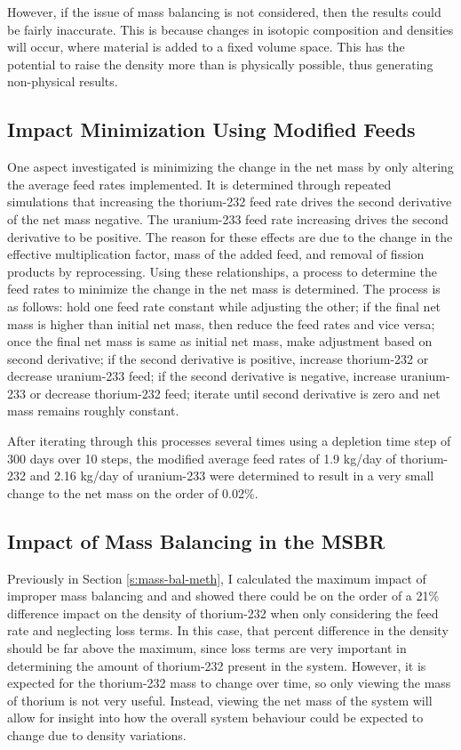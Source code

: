 However, if the issue of mass balancing is not considered, then the results could be fairly inaccurate.
This is because changes in isotopic composition and densities will occur, where material is added to a fixed volume space. This has the potential to raise the density more than is physically possible, thus generating non-physical results.

\subsection{Impact Minimization Using Modified Feeds}

One aspect investigated is minimizing the change in the net mass by only altering the average feed rates implemented. It is determined through repeated simulations that increasing the thorium-232 feed rate drives the second derivative of the net mass negative. The uranium-233 feed rate increasing drives the second derivative to be positive. The reason for these effects are due to the change in the effective multiplication factor, mass of the added feed, and removal of fission products by reprocessing.
Using these relationships, a process to determine the feed rates to minimize the change in the net mass is determined. The process is as follows:  hold one feed rate constant while adjusting the other;
if the final net mass is higher than initial net mass, then reduce the feed rates and vice versa;
once the final net mass is same as initial net mass, make adjustment based on second derivative;
if the second derivative is positive, increase thorium-232 or decrease uranium-233 feed;
if the second derivative is negative, increase uranium-233 or decrease thorium-232 feed;
iterate until second derivative is zero and net mass remains roughly constant.

After iterating through this processes several times using a depletion time step of 300 days over 10 steps, the modified average feed rates of 1.9 kg/day of thorium-232 and 2.16 kg/day of uranium-233 were determined to result in a very small change to the net mass on the order of 0.02\%.

\subsection{Impact of Mass Balancing in the MSBR}

Previously in Section \ref{s:mass-bal-meth}, I calculated the maximum impact of improper mass balancing and and showed there could be on the order of a 21\% difference impact on the density of thorium-232 when only considering the feed rate and neglecting loss terms. In this case, that percent difference in the density should be far above the maximum, since loss terms are very important in determining the amount of thorium-232 present in the system. However, it is expected for the thorium-232 mass to change over time, so only viewing the mass of thorium is not very useful. Instead, viewing the net mass of the system will allow for insight into how the overall system behaviour could be expected to change due to density variations.

